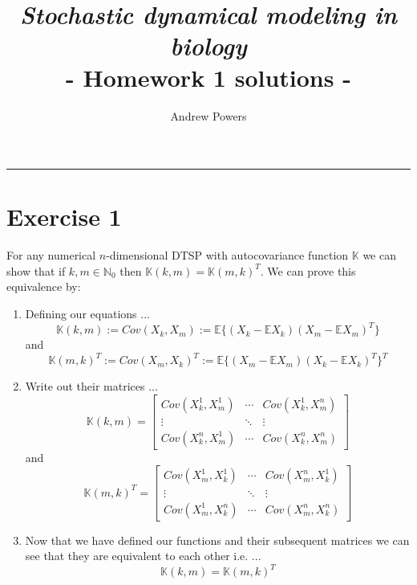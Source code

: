 \documentclass[letter,12pt]{article}
\title{\emph{Stochastic dynamical modeling in biology}\\\vspace{1em}- Homework 1 solutions -}
\author{Andrew Powers}
\date{}
\begin{document}
\maketitle %
\hrule %




\section*{Exercise 1}
For any numerical $n$-dimensional DTSP with autocovariance function $\mathbb{K}$ we can show that if
$ k,m\in\mathbb{N}_0$ then $\mathbb{K}(k,m) =\mathbb{K}(m,k)^T $. We can prove this equivalence by:

\begin{enumerate}[1.]
\item Defining our equations ...
\begin{equation}\label{eqn:EQ_COV_1}
	\mathbb{K}(k,m) := Cov(X_k,X_m) := \mathbb{E}\{(X_k - \mathbb{E}X_k)(X_m - \mathbb{E}X_m)^T\}
\end{equation}
and
\begin{equation}\label{eqn:EQ_COV_2}
	\mathbb{K}(m,k)^T := Cov(X_m,X_k)^T := \mathbb{E}\{(X_m - \mathbb{E}X_m)(X_k - \mathbb{E}X_k)^T\}^T
\end{equation}
\item Write out their matrices ...
\begin{equation}\label{eqn:MAT_EQ_1}
	\mathbb{K}(k,m) = 
	\begin{bmatrix}
		Cov(X^{1}_k,X^{1}_m) & \cdots & Cov(X^{1}_k,X^{n}_m) \\
		\vdots & \ddots & \vdots \\
		Cov(X^{n}_k,X^{1}_m) & \cdots & Cov(X^{n}_k,X^{n}_m)
	\end{bmatrix}
\end{equation}
and
\begin{equation}\label{MAT_EQ_2}
	\mathbb{K}(m,k)^T = 
	\begin{bmatrix}
		Cov(X^{1}_m,X^{1}_k) & \cdots & Cov(X^{n}_m,X^{1}_k) \\
		\vdots & \ddots & \vdots \\
		Cov(X^{1}_m,X^{n}_k) & \cdots & Cov(X^{n}_m,X^{n}_k)
	\end{bmatrix}
\end{equation}
\item Now that we have defined our functions and their subsequent matrices we can see that they are
equivalent to each other i.e. ...
\begin{equation}
	\mathbb{K}(k,m) = \mathbb{K}(m,k)^T
\end{equation}
\end{enumerate}
\end{document}
